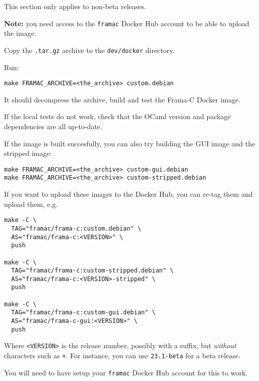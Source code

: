 This section only applies to non-beta releases.

\textbf{Note:} you need access to the \texttt{framac} Docker Hub account to be
able to upload the image.

Copy the \texttt{.tar.gz} archive to the \texttt{dev/docker} directory.

Run:
\begin{lstlisting}
make FRAMAC_ARCHIVE=<the_archive> custom.debian
\end{lstlisting}
It should decompress the archive, build and test the Frama-C Docker image.

If the local tests do not work, check that the OCaml version and package
dependencies are all up-to-date.

If the image is built succesfully, you can also try building the GUI image and
the stripped image:
\begin{lstlisting}
make FRAMAC_ARCHIVE=<the_archive> custom-gui.debian
make FRAMAC_ARCHIVE=<the_archive> custom-stripped.debian
\end{lstlisting}

If you want to upload these images to the Docker Hub, you can re-tag them and
upload them, e.g.

\begin{lstlisting}
make -C \
  TAG="framac/frama-c:custom.debian" \
  AS="framac/frama-c:<VERSION>" \
  push

make -C \
  TAG="framac/frama-c:custom-stripped.debian" \
  AS="framac/frama-c:<VERSION>-stripped" \
  push

make -C \
  TAG="framac/frama-c:custom-gui.debian" \
  AS="framac/frama-c-gui:<VERSION>" \
  push
\end{lstlisting}

Where \texttt{<VERSION>} is the release number, possibly with a suffix, but
{\em without} characters such as \texttt{+}. For instance, you can use
\texttt{23.1-beta} for a beta release.

You will need to have setup your \texttt{framac} Docker Hub account for this to work.

